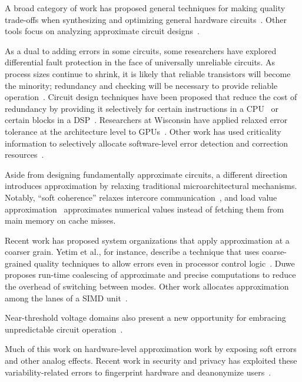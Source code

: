 A broad category of work has proposed general techniques for making quality trade-offs
when synthesizing and optimizing general hardware
circuits~\cite{lossysynthesis, palem-pruning, rahimi, axilog, miao-thesis, synthesis-date14, venkataramani-date13, venkataramani-dac12}.
Other tools focus on analyzing approximate circuit
designs~\cite{venkatesan-iccad11, tziantzioulis-dac15}.

As a dual to adding errors in some circuits, some researchers have
explored differential fault protection in the face of universally unreliable
circuits. As process sizes continue to shrink, it is likely that reliable
transistors will become the minority; redundancy and checking will be
necessary to provide reliable operation~\cite{li-asplos08}. Circuit design
techniques have been proposed that reduce the cost of redundancy by providing
it selectively for certain instructions in a CPU~\cite{wreft} or certain
blocks in a DSP~\cite{unequal-protection, ant, micropower-dsp}.
Researchers at Wisconsin have applied relaxed error tolerance at the
architecture level to GPUs~\cite{palframan-gpu}.
Other work has used criticality information to selectively allocate
software-level error detection and correction
resources~\cite{khudia-tolerance, shi-cal}.

Aside from designing fundamentally approximate circuits, a different direction
introduces approximation by relaxing traditional microarchitectural
mechanisms.
Notably, ``soft coherence'' relaxes intercore
communication~\cite{softcoherence},
and load value approximation~\cite{lva-sanmiguel, lva-thwaites} approximates
numerical values instead of fetching them from main memory on cache misses.

Recent work has proposed system organizations that apply approximation at a
coarser grain.
Yetim et al., for instance,
describe a technique that uses coarse-grained quality techniques to
allow errors even in processor control logic~\cite{martonosi-date, commguard}.
Duwe~\cite{duwe-thesis} proposes run-time coalescing of approximate and
precise computations to reduce the overhead of switching between modes.
Other work allocates approximation among the lanes of a SIMD
unit~\cite{tabsh}.

Near-threshold voltage domains also present a new opportunity for embracing
unpredictable circuit operation~\cite{soft-ntc}.

Much of this work on hardware-level approximation work by exposing
soft errors and other analog effects.
Recent work in security and privacy has exploited these variability-related
errors to fingerprint hardware and deanonymize users~\cite{deanondram}.




